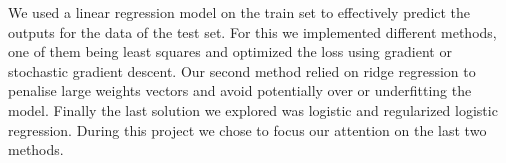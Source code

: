 \documentclass[10pt,conference,compsocconf]{IEEEtran}
\begin{document}

We used a linear regression model on the train set to effectively 
predict the outputs for the data of the test set. For this we implemented 
different methods, one of them being least squares and optimized the 
loss using gradient or stochastic gradient descent.
Our second method relied on ridge regression to penalise large weights 
vectors and avoid potentially over or underfitting the model.
Finally the last solution we explored was logistic and regularized 
logistic regression. During this project we chose to focus our attention on
the last two methods.
\end{document}
